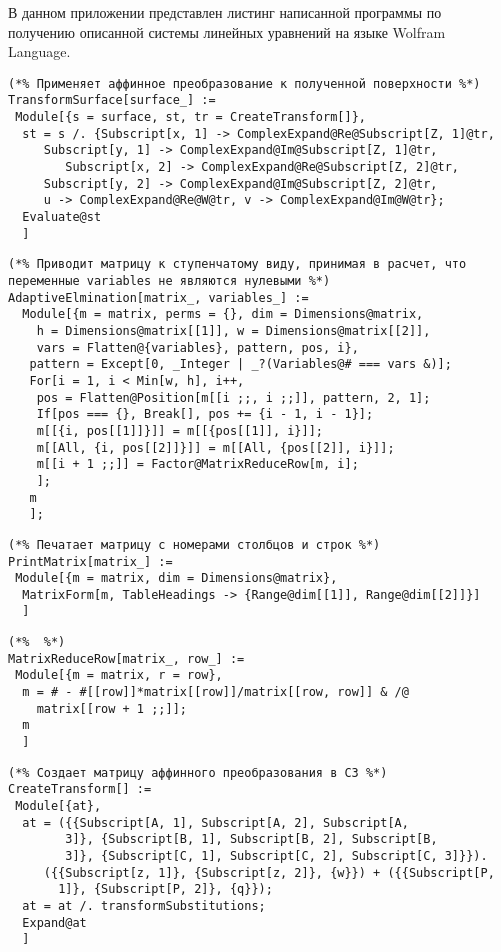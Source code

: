 \documentclass[../main.tex]{subfiles}
\begin{document}
В данном приложении представлен листинг написанной программы по получению описанной системы линейных уравнений на языке {\ttfamily Wolfram Language}. 

\begin{lstlisting}
(*% Применяет аффинное преобразование к полученной поверхности %*)
TransformSurface[surface_] :=
 Module[{s = surface, st, tr = CreateTransform[]},
  st = s /. {Subscript[x, 1] -> ComplexExpand@Re@Subscript[Z, 1]@tr, 
     Subscript[y, 1] -> ComplexExpand@Im@Subscript[Z, 1]@tr,
     	Subscript[x, 2] -> ComplexExpand@Re@Subscript[Z, 2]@tr, 
     Subscript[y, 2] -> ComplexExpand@Im@Subscript[Z, 2]@tr,
     u -> ComplexExpand@Re@W@tr, v -> ComplexExpand@Im@W@tr};
  Evaluate@st
  ]
\end{lstlisting}

\begin{lstlisting}
(*% Приводит матрицу к ступенчатому виду, принимая в расчет, что переменные variables не являются нулевыми %*)
AdaptiveElmination[matrix_, variables_] :=
  Module[{m = matrix, perms = {}, dim = Dimensions@matrix,
    h = Dimensions@matrix[[1]], w = Dimensions@matrix[[2]],
    vars = Flatten@{variables}, pattern, pos, i},
   pattern = Except[0, _Integer | _?(Variables@# === vars &)];
   For[i = 1, i < Min[w, h], i++,
    pos = Flatten@Position[m[[i ;;, i ;;]], pattern, 2, 1];
    If[pos === {}, Break[], pos += {i - 1, i - 1}];
    m[[{i, pos[[1]]}]] = m[[{pos[[1]], i}]];
    m[[All, {i, pos[[2]]}]] = m[[All, {pos[[2]], i}]];
    m[[i + 1 ;;]] = Factor@MatrixReduceRow[m, i];
    ];
   m
   ];
\end{lstlisting}

\begin{lstlisting}
(*% Печатает матрицу с номерами столбцов и строк %*)
PrintMatrix[matrix_] :=
 Module[{m = matrix, dim = Dimensions@matrix},
  MatrixForm[m, TableHeadings -> {Range@dim[[1]], Range@dim[[2]]}]
  ]
\end{lstlisting}

\begin{lstlisting}
(*%  %*)
MatrixReduceRow[matrix_, row_] :=
 Module[{m = matrix, r = row},
  m = # - #[[row]]*matrix[[row]]/matrix[[row, row]] & /@ 
    matrix[[row + 1 ;;]];
  m
  ]
\end{lstlisting}

\begin{lstlisting}
(*% Создает матрицу аффинного преобразования в C3 %*)
CreateTransform[] :=
 Module[{at},
  at = ({{Subscript[A, 1], Subscript[A, 2], Subscript[A, 
        3]}, {Subscript[B, 1], Subscript[B, 2], Subscript[B, 
        3]}, {Subscript[C, 1], Subscript[C, 2], Subscript[C, 3]}}).
     ({{Subscript[z, 1]}, {Subscript[z, 2]}, {w}}) + ({{Subscript[P, 
       1]}, {Subscript[P, 2]}, {q}});
  at = at /. transformSubstitutions;
  Expand@at
  ]
\end{lstlisting}
\end{document}
